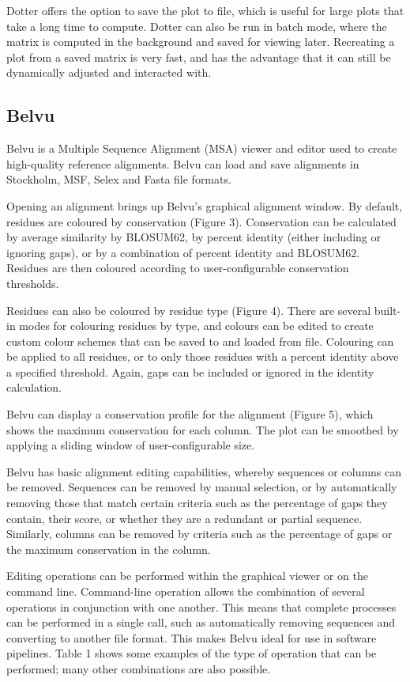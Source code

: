 \documentclass[10pt]{bmc_article}
\newenvironment{bmcformat}{\begin{raggedright}\baselineskip20pt\sloppy\setboolean{publ}{false}}{\end{raggedright}\baselineskip20pt\sloppy}
\begin{document}
\begin{bmcformat}
Dotter offers the option to save the plot to file, which is useful for large plots that take a long time to compute.  Dotter can also be run in batch mode, where the matrix is computed in the background and saved for viewing later.  Recreating a plot from a saved matrix is very fast, and has the advantage that it can still be dynamically adjusted and interacted with.

\subsection*{Belvu}
Belvu is a Multiple Sequence Alignment (MSA) viewer and editor used to create high-quality reference alignments. Belvu can load and save alignments in Stockholm, MSF, Selex and Fasta file formats.

Opening an alignment brings up Belvu's graphical alignment window.  By default, residues are coloured by conservation (Figure 3).  Conservation can be calculated by average similarity by BLOSUM62, by percent identity (either including or ignoring gaps), or by a combination of percent identity and BLOSUM62.  Residues are then coloured according to user-configurable conservation thresholds.

Residues can also be coloured by residue type (Figure 4).  There are several built-in modes for colouring residues by type, and colours can be edited to create custom colour schemes that can be saved to and loaded from file.  Colouring can be applied to all residues, or to only those residues with a percent identity above a specified threshold.  Again, gaps can be included or ignored in the identity calculation.

Belvu can display a conservation profile for the alignment (Figure 5), which shows the maximum conservation for each column.  The plot can be smoothed by applying a sliding window of user-configurable size.

Belvu has basic alignment editing capabilities, whereby sequences or columns can be removed.  Sequences can be removed by manual selection, or by automatically removing those that match certain criteria such as the percentage of gaps they contain, their score, or whether they are a redundant or partial sequence.  Similarly, columns can be removed by criteria such as the percentage of gaps or the maximum conservation in the column.

Editing operations can be performed within the graphical viewer or on the command line. Command-line operation allows the combination of several operations in conjunction with one another. This means that complete processes can be performed in a single call, such as automatically removing sequences and converting to another file format.  This makes Belvu ideal for use in software pipelines.  Table 1 shows some examples of the type of operation that can be performed; many other combinations are also possible.


\end{bmcformat}
\end{document}
